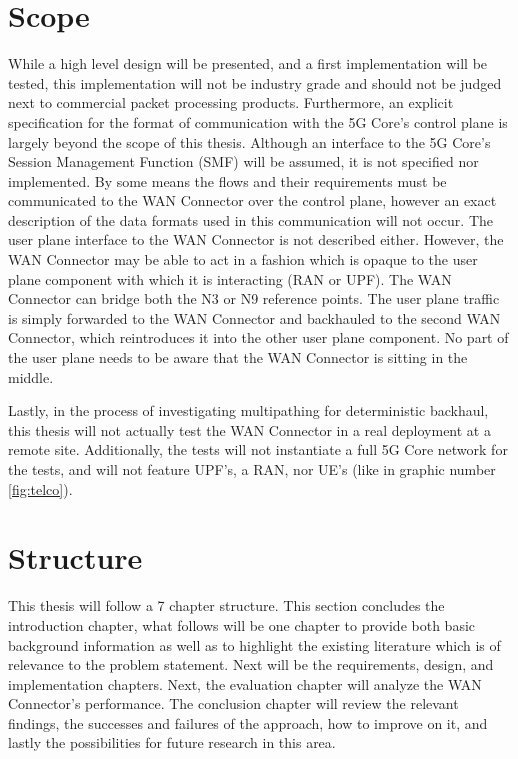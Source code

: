 \section{Scope}
\label{sec:scope}

While a high level design will be presented, and a first implementation will be tested, this implementation will not be industry grade and should not be judged next to commercial packet processing products.  Furthermore, an explicit specification for the format of communication with the 5G Core's control plane is largely beyond the scope of this thesis. Although an interface to the 5G Core's Session Management Function (SMF) will be assumed, it is not specified nor implemented. By some means the flows and their requirements must be communicated to the WAN Connector over the control plane, however an exact description of the data formats used in this communication will not occur. The user plane interface to the WAN Connector is not described either. However, the WAN Connector may be able to act in a fashion which is opaque to the user plane component with which it is interacting (RAN or UPF). The WAN Connector can bridge both the N3 or N9 reference points. The user plane traffic is simply forwarded to the WAN Connector and backhauled to the second WAN Connector, which reintroduces it into the other user plane component. No part of the user plane needs to be aware that the WAN Connector is sitting in the middle.

Lastly, in the process of investigating multipathing for deterministic backhaul, this thesis will not actually test the WAN Connector in a real deployment at a remote site. Additionally, the tests will not instantiate a full 5G Core network for the tests, and will not feature UPF's, a RAN, nor UE's (like in graphic number \ref{fig:telco}).

\section{Structure}

This thesis will follow a 7 chapter structure. This section concludes the introduction chapter, what follows will be one chapter to provide both basic background information as well as to highlight the existing literature which is of relevance to the problem statement. Next will be the requirements, design, and implementation chapters. Next, the evaluation chapter will analyze the WAN Connector's performance. The conclusion chapter will review the relevant findings, the successes and failures of the approach, how to improve on it, and lastly the possibilities for future research in this area.




